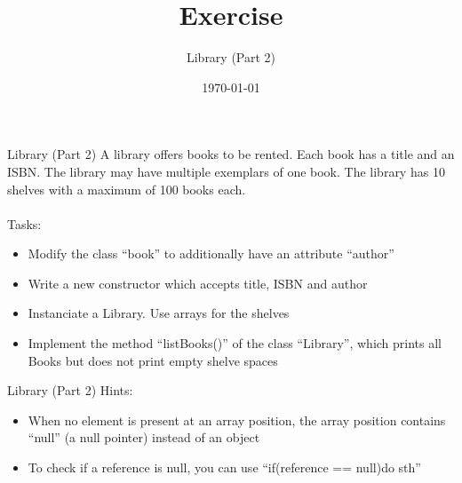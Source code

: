 


\title{Exercise}
\subtitle{Library (Part 2)}
\date{\today}




\begin{frame}
    \titlepage
\end{frame}

\begin{frame}{Library (Part 2)}
    A library offers books to be rented. Each book has a title and an ISBN. The library may have multiple exemplars of one book. The library has 10 shelves with a maximum of 100 books each.\\
    \\
    Tasks:
    \begin{itemize}
        \item Modify the class ``book'' to additionally have an attribute ``author'' 
        \item Write a new constructor which accepts title, ISBN and author
        \item Instanciate a Library. Use arrays for the shelves
        \item Implement the method ``listBooks()'' of the class ``Library'', which prints all Books but does not print empty shelve spaces
    \end{itemize}
\end{frame}

\begin{frame}{Library (Part 2)}
    Hints:
    \begin{itemize}
        \item When no element is present at an array position, the array position contains ``null'' (a null pointer) instead of an object
        \item To check if a reference is null, you can use ``if(reference == null){do sth}''
    \end{itemize}
\end{frame}



